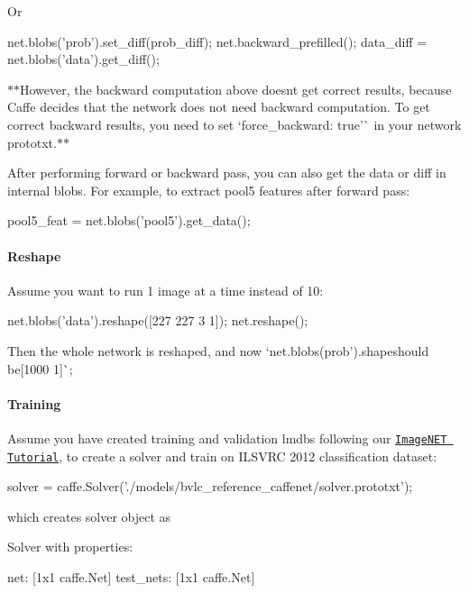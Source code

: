 Or \begin{DoxyVerb}net.blobs('prob').set_diff(prob_diff);
net.backward_prefilled();
data_diff = net.blobs('data').get_diff();
\end{DoxyVerb}


$\ast$$\ast$\+However, the backward computation above doesn\textquotesingle{}t get correct results, because Caffe decides that the network does not need backward computation. To get correct backward results, you need to set `\textquotesingle{}force\+\_\+backward\+: true'\`{} in your network prototxt.$\ast$$\ast$

After performing forward or backward pass, you can also get the data or diff in internal blobs. For example, to extract pool5 features after forward pass\+: \begin{DoxyVerb}pool5_feat = net.blobs('pool5').get_data();
\end{DoxyVerb}


\paragraph*{Reshape}

Assume you want to run 1 image at a time instead of 10\+: \begin{DoxyVerb}net.blobs('data').reshape([227 227 3 1]); %
net.reshape();
\end{DoxyVerb}


Then the whole network is reshaped, and now `net.\+blobs(\textquotesingle{}prob').shape{\ttfamily should be}\mbox{[}1000 1\mbox{]}\`{};

\paragraph*{Training}

Assume you have created training and validation lmdbs following our \href{http://caffe.berkeleyvision.org/gathered/examples/imagenet.html}{\tt Image\+N\+ET Tutorial}, to create a solver and train on I\+L\+S\+V\+RC 2012 classification dataset\+: \begin{DoxyVerb}solver = caffe.Solver('./models/bvlc_reference_caffenet/solver.prototxt');
\end{DoxyVerb}


which creates {\ttfamily solver} object as \begin{DoxyVerb}  Solver with properties:

          net: [1x1 caffe.Net]
    test_nets: [1x1 caffe.Net]
\end{DoxyVerb}


